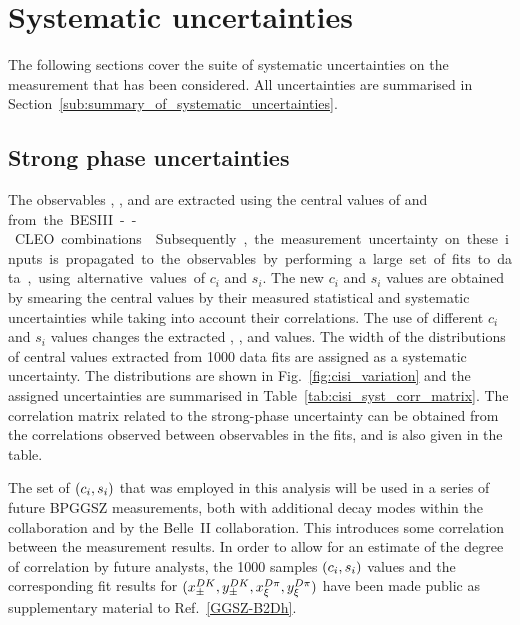 \section{Systematic uncertainties} %
\label{sec:systematic_uncertainties}

The following sections cover the suite of systematic uncertainties on the measurement that has been considered. All uncertainties are summarised in Section~\ref{sub:summary_of_systematic_uncertainties}.

\subsection{Strong phase uncertainties} %
\label{sub:strong_phase_uncertainties}

The observables \xpmdk, \ypmdk, \xxidpi and \yxidpi are extracted using the central values of \ci and \si from the BESIII--CLEO combinations~\cite{CLEOCISI,BESCISI,BESCISIKSKK}. Subsequently, the measurement uncertainty on these inputs is propagated to the observables by performing a large set of fits to data, using alternative values of $c_i$ and $s_i$. The new $c_i$ and $s_i$ values are obtained by smearing the central values by their measured statistical and systematic uncertainties while taking into account their correlations. 
The use of different $c_i$ and $s_i$ values changes the extracted \xpmdk, \ypmdk, \xxidpi and \yxidpi values. The width of the distributions of central values extracted from 1000 data fits are assigned as a systematic uncertainty. The distributions are shown in Fig.~\ref{fig:cisi_variation} and the assigned uncertainties are summarised in Table~\ref{tab:cisi_syst_corr_matrix}. The correlation matrix related to the strong-phase uncertainty can be obtained from the correlations observed between observables in the fits, and is also given in the table. 

The set of $(c_i, s_i)$ that was employed in this analysis will be used in a series of future BPGGSZ measurements, both with additional \B decay modes within the \lhcb collaboration and by the Belle~II collaboration. This introduces some correlation between the measurement results. In order to allow for an estimate of the degree of correlation by future analysts, the 1000 samples $(c_i,s_i)$ values and the corresponding fit results for $(x_\pm^{{D}{K}}, y_\pm^{{D}{K}}, x_\xi^{{D}\pi}, y_\xi^{{D}\pi})$ have been made public as supplementary material to Ref.~\ref{GGSZ-B2Dh}.




